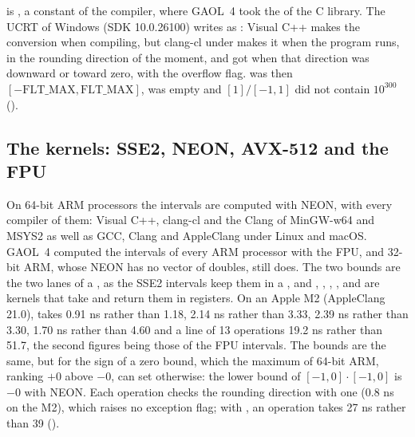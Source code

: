 \documentclass[12pt,a4paper,twoside,openright]{book}
\begin{document}
\medskip
{} is , a
constant of the compiler, where GAOL~4 took the  of the C
library.\newinvfive{} The UCRT of Windows (SDK 10.0.26100) writes
 as : Visual C++ makes the
conversion when compiling, but clang-cl under  makes it
when the program runs, in the rounding direction of the moment, and got
 when that direction was downward or toward zero, with the
overflow flag.  was then $[-\mathrm{FLT\_MAX},
\mathrm{FLT\_MAX}]$,  was empty and $[1]/[-1, 1]$ did
not contain $10^{300}$ ().

\subsection{The kernels: SSE2, NEON, AVX-512 and the FPU}
\label{sec:changes-kernels}
%

On 64-bit ARM processors the intervals are computed with NEON, with every
compiler of them: Visual C++, clang-cl and the Clang of MinGW-w64 and MSYS2 as
well as GCC, Clang and AppleClang under Linux and macOS.\newinvfive{} GAOL~4
computed the intervals of every ARM processor with the FPU, and 32-bit ARM,
whose NEON has no vector of doubles, still does. The two bounds are the two
lanes of a , as the SSE2 intervals keep them in a
, and \code{+}, \code{-}, \code{*}, \code{/}, 
and  are kernels that take and return them in registers. On an
Apple M2 (AppleClang 21.0),  takes 0.91 ns rather than 1.18,
 2.14 ns rather than 3.33,  2.39 ns rather than 3.30,
 1.70 ns rather than 4.60 and a line of 13 operations 19.2 ns
rather than 51.7, the second figures being those of the FPU intervals. The
bounds are the same, but for the sign of a zero bound, which the maximum of
64-bit ARM, ranking $+0$ above $-0$, can set otherwise: the lower bound of
$[-1, 0] \cdot [-1, 0]$ is $-0$ with NEON. Each operation checks the rounding
direction with one  (0.8 ns on the M2), which raises no exception
flag; with , an operation takes 27 ns rather
than 39 ().
\end{document}
